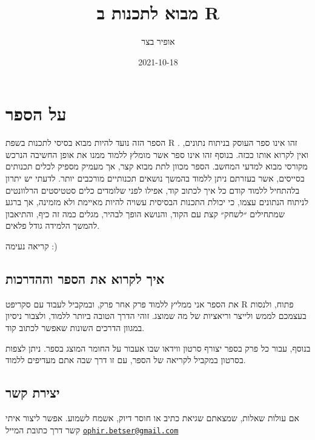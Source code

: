 \documentclass[
]{book}
\title{מבוא לתכנות ב R}
\author{אופיר בצר}
\date{2021-10-18}
\begin{document}
\maketitle

{
\setcounter{tocdepth}{1}
\tableofcontents
}
\hypertarget{ux5e2ux5dc-ux5d4ux5e1ux5e4ux5e8}{%
\chapter{על הספר}\label{ux5e2ux5dc-ux5d4ux5e1ux5e4ux5e8}}

הספר הזה נועד להיות מבוא בסיסי לתכנות בשפת
R
.
זהו אינו ספר העוסק בניתוח נתונים, ואין לקרוא אותו ככזה. בנוסף זהו אינו ספר אשר מומלץ ללמוד ממנו את אופן החשיבה הנרכש מקורסי מבוא למדעי המחשב. הספר מכוון לתת מבוא קצר, אך מעמיק מספיק לכלים תכנותים בסייסים, אשר בעזרתם ניתן ללמוד בהמשך נושאים תכנותיים מורכבים יותר. לדעתי יש יתרון בלהתחיל ללמוד קודם כל איך לכתוב קוד, אפילו לפני שלומדים כלים סטטיסטים הרלוונטים לניתוח הנתונים עצמו, כי יכולת התכנות הבסיסית עשויה להיות מאיימת ולא מזמינה, אך ברגע שמתחילים ״לשחק״ קצת עם הקוד, והנושא הופך לבהיר, מגלים כמה זה כיף, והתיאבון להמשך הלמידה גודל פלאים.

קריאה נעימה :)

\hypertarget{ux5d0ux5d9ux5da-ux5dcux5e7ux5e8ux5d5ux5d0-ux5d0ux5ea-ux5d4ux5e1ux5e4ux5e8-ux5d5ux5d4ux5d4ux5d3ux5e8ux5dbux5d5ux5ea}{%
\section{איך לקרוא את הספר וההדרכות}\label{ux5d0ux5d9ux5da-ux5dcux5e7ux5e8ux5d5ux5d0-ux5d0ux5ea-ux5d4ux5e1ux5e4ux5e8-ux5d5ux5d4ux5d4ux5d3ux5e8ux5dbux5d5ux5ea}}

את הספר אני ממליץ ללמוד פרק אחר פרק, ובמקביל לעבוד עם סקריפט
R
פתוח, ולנסות בעצמכם לממש ולייצר וריאציות של מה שמוצג. זוהי הדרך הטובה ביותר ללמוד, ולצבור ניסיון במגוון הדרכים השונות שאפשר לכתוב קוד.

בנוסף, עבור כל פרק בספר יצורף סרטון ווידאו שבו אעבור על החומר המוצג בספר. ניתן לצפות בסרטון במקביל לקריאה של הספר, עם זו דרך שבה אתם מעדיפים ללמוד.

\hypertarget{ux5d9ux5e6ux5d9ux5e8ux5ea-ux5e7ux5e9ux5e8}{%
\section{יצירת קשר}\label{ux5d9ux5e6ux5d9ux5e8ux5ea-ux5e7ux5e9ux5e8}}

אם עולות שאלות, שמצאתם שגיאת כתיב או חוסר דיוק, אשמח לשמוע.
אפשר ליצור איתי קשר דרך כתובת המייל
\href{mailto:ophir.betser@gmail.com}{\nolinkurl{ophir.betser@gmail.com}}
\end{document}
